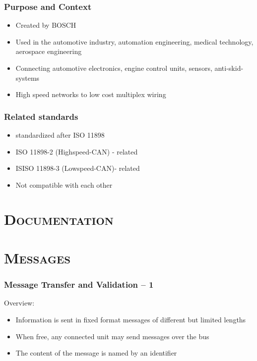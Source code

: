 \documentclass[xcolor=x11names,compress]{beamer}
\renewcommand{\(}{\begin{columns}}
\renewcommand{\)}{\end{columns}}
\newcommand{\<}[1]{\begin{column}{#1}}
\renewcommand{\>}{\end{column}}
\begin{document}
\begin{frame}
  \frametitle{Purpose and Context }
  \begin{itemize}
      \item Created by BOSCH
      \item Used in the automotive industry, automation engineering, medical technology, aerospace engineering
      \item Connecting automotive electronics, engine control units, sensors, anti-skid-systems
      \item High speed networks to low cost multiplex wiring
  \end{itemize}

\end{frame}

\begin{frame}
  \frametitle{Related standards}
  \begin{itemize}
      \item standardized after ISO 11898
      \item ISO 11898-2 (Highspeed-CAN) - related
      \item ISISO 11898-3 (Lowspeed-CAN)- related      
      \item Not compatible with each other
  \end{itemize}

\end{frame}

%

\section{\scshape Documentation}

\section{\scshape Messages}
\begin{frame}
  \frametitle{Message Transfer and Validation -- 1}
  Overview:
  \begin{itemize}
    \item Information is sent in fixed format messages of different but limited lengths
    \item When free, any connected unit may send messages over the bus
    \item The content of the message is named by an identifier
  \end{itemize}

\end{frame}
\end{document}
